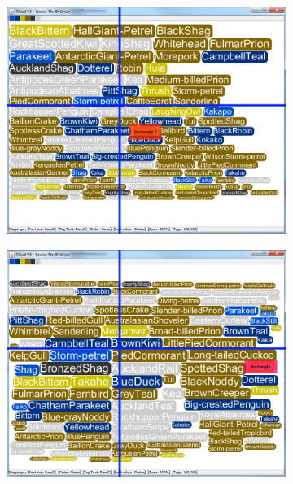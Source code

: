 \begin{figure}[!htb]
\begin{subfigure}{.5\textwidth}
  \includegraphics[scale=0.25]{Experiment1/Trial2/C1S2L2.png}
\end{subfigure}%
\begin{subfigure}{.5\textwidth}
  \centering
 \includegraphics[scale=0.25]{Experiment1/Trial2/C1S2L1.png}
\end{subfigure}
\begin{subfigure}{.5\textwidth}
  \centering

\end{subfigure}
\end{figure}

